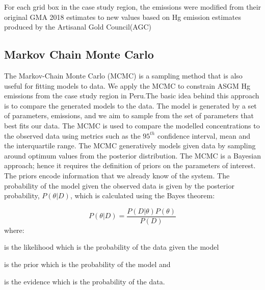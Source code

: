 \begin{flushleft}
For each grid box in the case study region, the emissions were modified from their original GMA 2018 estimates to new values based on Hg emission estimates produced by the Artisanal Gold Council(AGC)
\end{flushleft}
\subsection{Markov Chain Monte Carlo}

\begin{flushleft}
The Markov-Chain Monte Carlo (MCMC) is a sampling method that is also useful for fitting models to data\cite{hogg_data_2018}. We apply the MCMC to constrain ASGM Hg emissions from the case study region in Peru.The basic idea behind this approach is to compare the generated models to the data. The model is generated by a set of parameters, emissions, and we aim to sample from the set of parameters that best fits our data. The MCMC is used to compare the modelled concentrations to the observed data using metrics such as the $95^{th}$ confidence interval, mean and the interquartile range. The MCMC generatively models given data by sampling around optimum values from the posterior distribution. The MCMC is a Bayesian approach; hence it requires the definition of priors on the parameters of interest. The priors encode information that we already know of the system. The probability of the model given the observed data is given by the posterior probability, $P(\theta|D)$, which is calculated using the Bayes theorem:

\begin{equation}
\label{bayes_eq}
P(\theta|D)=\frac{P(D|\theta)P(\theta)}{P(D)}
\end{equation}
where:
\end{flushleft}

\begin{description}[leftmargin=!,labelwidth={3 em}]
    \item [$P(D|\theta)$] is the likelihood which is the probability of the data given the model
    \item [$P(\theta)$] is the prior which is the probability of the model and 
    \item [$P(D)$] is the evidence which is the probability of the data.
\end{description}

